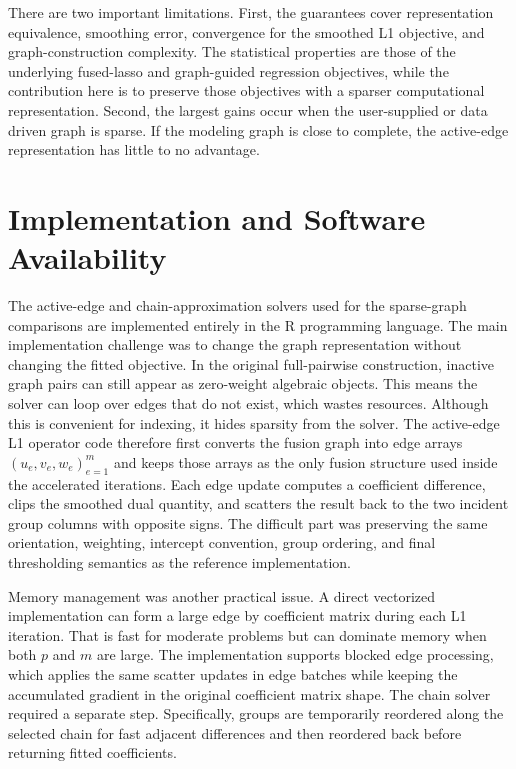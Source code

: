 \documentclass[twoside,11pt]{article}
\begin{document}
There are two important limitations. 
First, the guarantees cover representation equivalence, smoothing error, convergence for the smoothed L1 objective, and graph-construction complexity. 
The statistical properties are those of the underlying fused-lasso and graph-guided regression objectives, while the contribution here is to preserve those objectives with a sparser computational representation. 
Second, the largest gains occur when the user-supplied or data driven graph is sparse. 
If the modeling graph is close to complete, the active-edge representation has little to no advantage.

\section{Implementation and Software Availability}
The active-edge and chain-approximation solvers used for the sparse-graph comparisons are implemented entirely in the R programming language.
The main implementation challenge was to change the graph representation without changing the fitted objective. 
In the original full-pairwise construction, inactive graph pairs can still appear as zero-weight algebraic objects.
This means the solver can loop over edges that do not exist, which wastes resources.
Although this is convenient for indexing, it hides sparsity from the solver. 
The active-edge L1 operator code therefore first converts the fusion graph into edge arrays $(u_e,v_e,w_e)_{e=1}^m$ and keeps those arrays as the only fusion structure used inside the accelerated iterations. 
Each edge update computes a coefficient difference, clips the smoothed dual quantity, and scatters the result back to the two incident group columns with opposite signs. 
The difficult part was preserving the same orientation, weighting, intercept convention, group ordering, and final thresholding semantics as the reference implementation.

Memory management was another practical issue. 
A direct vectorized implementation can form a large edge by coefficient matrix during each L1 iteration. 
That is fast for moderate problems but can dominate memory when both $p$ and $m$ are large. 
The implementation supports blocked edge processing, which applies the same scatter updates in edge batches while keeping the accumulated gradient in the original coefficient matrix shape.
The chain solver required a separate step. 
Specifically, groups are temporarily reordered along the selected chain for fast adjacent differences and then reordered back before returning fitted coefficients.
\end{document}
